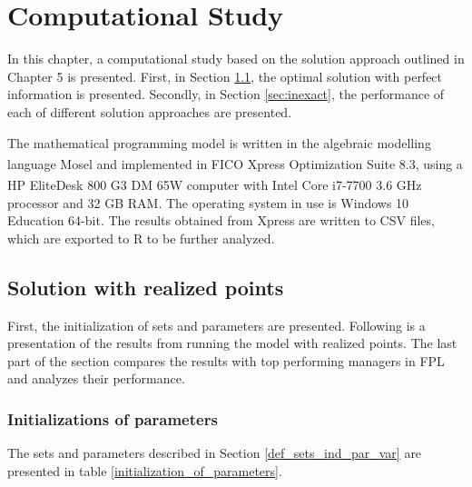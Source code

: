 
\chapter{Computational Study}


In this chapter, a computational study based on the solution approach outlined in Chapter 5 is presented. First, in Section \ref{sec:exact}, the optimal solution with perfect information is presented. Secondly, in Section \ref{sec:inexact}, the performance of each of different solution approaches are presented. 


The mathematical programming model is written in the algebraic modelling language Mosel and implemented in FICO\textsuperscript {\textregistered} Xpress Optimization Suite 8.3, using a HP EliteDesk 800 G3 DM 65W computer with Intel\textsuperscript{\textregistered} Core\textsuperscript{\texttrademark} i7-7700 3.6 GHz processor and 32 GB RAM. The operating system in use is Windows 10 Education 64-bit. The results obtained from Xpress are written to CSV files, which are exported to R to be further analyzed. 

\section{Solution with realized points}\label{sec:exact}
First, the initialization of sets and parameters are presented. Following is a presentation of the results from running the model with realized points. The last part of the section compares the results with top performing managers in FPL and analyzes their performance. 

\subsection{Initializations of parameters}    
The sets and parameters described in Section \ref{def_sets_ind_par_var} are presented in table \ref{initialization_of_parameters}. 



